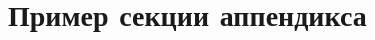 \documentclass[a4paper,12pt]{extarticle}
\begin{document}
\newpage
\printbibliography[heading=bibintoc]


\newpage
\appendix

\section{Пример секции аппендикса}
\end{document}
